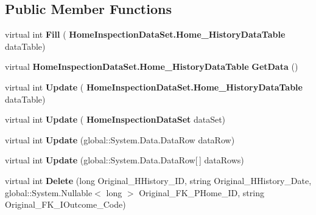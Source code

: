\subsection*{Public Member Functions}
\begin{DoxyCompactItemize}
\item 
\mbox{\label{class_a_f_h___scheduler_1_1_home_inspection_data_set_table_adapters_1_1_home___history_table_adapter_ae99d6742a69280929cee4121f4c2ff09}} 
virtual int {\bfseries Fill} (\textbf{ Home\+Inspection\+Data\+Set.\+Home\+\_\+\+History\+Data\+Table} data\+Table)
\item 
\mbox{\label{class_a_f_h___scheduler_1_1_home_inspection_data_set_table_adapters_1_1_home___history_table_adapter_ac83e6a849cd72360378a5ebc9a46692a}} 
virtual \textbf{ Home\+Inspection\+Data\+Set.\+Home\+\_\+\+History\+Data\+Table} {\bfseries Get\+Data} ()
\item 
\mbox{\label{class_a_f_h___scheduler_1_1_home_inspection_data_set_table_adapters_1_1_home___history_table_adapter_ab4545db4aac6774b58491e0c97692e5b}} 
virtual int {\bfseries Update} (\textbf{ Home\+Inspection\+Data\+Set.\+Home\+\_\+\+History\+Data\+Table} data\+Table)
\item 
\mbox{\label{class_a_f_h___scheduler_1_1_home_inspection_data_set_table_adapters_1_1_home___history_table_adapter_af0286eeaeb83745fb54be95ed6401b5c}} 
virtual int {\bfseries Update} (\textbf{ Home\+Inspection\+Data\+Set} data\+Set)
\item 
\mbox{\label{class_a_f_h___scheduler_1_1_home_inspection_data_set_table_adapters_1_1_home___history_table_adapter_a6a18fa9977fb21fb7b574680ca7dfcb3}} 
virtual int {\bfseries Update} (global\+::\+System.\+Data.\+Data\+Row data\+Row)
\item 
\mbox{\label{class_a_f_h___scheduler_1_1_home_inspection_data_set_table_adapters_1_1_home___history_table_adapter_aad2a403ed4f3f6072043f16409afe001}} 
virtual int {\bfseries Update} (global\+::\+System.\+Data.\+Data\+Row[$\,$] data\+Rows)
\item 
\mbox{\label{class_a_f_h___scheduler_1_1_home_inspection_data_set_table_adapters_1_1_home___history_table_adapter_af8aa5a25cca9cc1d1a159f4266a9840d}} 
virtual int {\bfseries Delete} (long Original\+\_\+\+H\+History\+\_\+\+ID, string Original\+\_\+\+H\+History\+\_\+\+Date, global\+::\+System.\+Nullable$<$ long $>$ Original\+\_\+\+F\+K\+\_\+\+P\+Home\+\_\+\+ID, string Original\+\_\+\+F\+K\+\_\+\+I\+Outcome\+\_\+\+Code)
\item 
\mbox{\label{class_a_f_h___scheduler_1_1_home_inspection_data_set_table_adapters_1_1_home___history_table_adapter_a8895909b3f58738f4a68e858b13a982a}} 

\end{DoxyCompactItemize}
